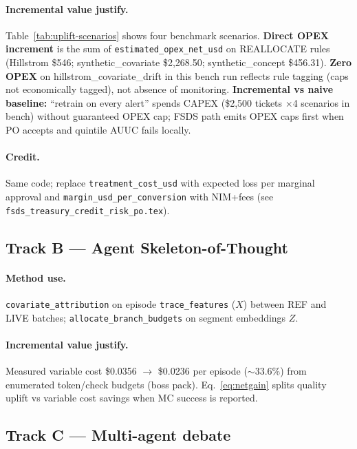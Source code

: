 \documentclass[11pt]{article}
\begin{document}
\paragraph{Incremental value justify.}
Table~\ref{tab:uplift-scenarios} shows four benchmark scenarios.
\textbf{Direct OPEX increment} is the sum of \texttt{estimated\_opex\_net\_usd} on REALLOCATE rules (Hillstrom \$546; synthetic\_covariate \$2{,}268.50; synthetic\_concept \$456.31).
\textbf{Zero OPEX} on hillstrom\_covariate\_drift in this bench run reflects rule tagging (caps not economically tagged), not absence of monitoring.
\textbf{Incremental vs naive baseline:} ``retrain on every alert'' spends CAPEX (\$2{,}500 tickets $\times$4 scenarios in bench) without guaranteed OPEX cap; FSDS path emits OPEX caps first when PO accepts and quintile AUUC fails locally.

\paragraph{Credit.}
Same code; replace \texttt{treatment\_cost\_usd} with expected loss per marginal approval and \texttt{margin\_usd\_per\_conversion} with NIM+fees (see \texttt{fsds\_treasury\_credit\_risk\_po.tex}).

\subsection{Track B --- Agent Skeleton-of-Thought}

\paragraph{Method use.}
\texttt{covariate\_attribution} on episode \texttt{trace\_features} ($X$) between REF and LIVE batches; \texttt{allocate\_branch\_budgets} on segment embeddings $Z$.

\paragraph{Incremental value justify.}
Measured variable cost \$0.0356 $\rightarrow$ \$0.0236 per episode ($\sim$33.6\%) from enumerated token/check budgets (boss pack).
Eq.~\eqref{eq:netgain} splits quality uplift vs variable cost savings when MC success is reported.

\subsection{Track C --- Multi-agent debate}
\end{document}
